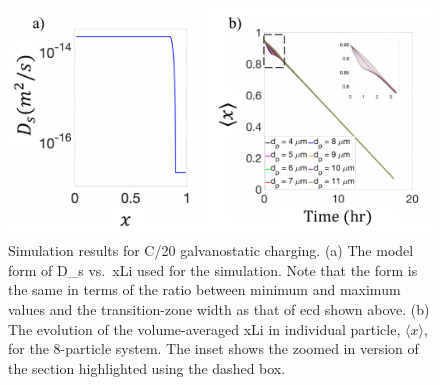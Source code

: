 \documentclass{article}
\begin{document}
\newpage
\begin{figure}[!h]
    \includegraphics[scale =0.7]{figures/modeling_figure_2_with_Ds_1000_cs_0.95.pdf}
    \caption{ Simulation results for C/20
      galvanostatic charging. (a) The model form of \gls{D_s}
      vs.\ \gls{xLi} used for the simulation. Note that the form is
      the same in terms of the ratio between minimum and maximum
      values and the transition-zone width as that of \gls{ecd} shown
      above. (b) The evolution of the volume-averaged \gls{xLi} in
      individual particle, $\langle x \rangle$, for the 8-particle
      system. The inset shows the zoomed in version of the section
      highlighted using the dashed box.}
    \label{fig:model-2}
\end{figure}


\newpage


\end{document}
